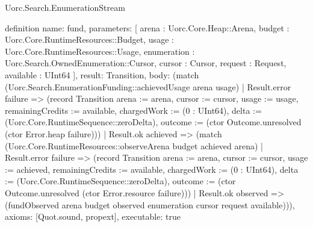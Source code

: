 \begin{lexlean}{Uorc.Search.EnumerationStream}
\begin{semanticmodule}
definition{
  name: fund,
  parameters: [
    arena : Uorc.Core.Heap::Arena,
    budget : Uorc.Core.RuntimeResources::Budget,
    usage : Uorc.Core.RuntimeResources::Usage,
    enumeration : Uorc.Search.OwnedEnumeration::Cursor,
    cursor : Cursor,
    request : Request,
    available : UInt64
  ],
  result: Transition,
  body: (match (Uorc.Search.EnumerationFunding::achievedUsage arena usage)
    | Result.error failure => (record Transition {arena := arena, cursor := cursor, usage := usage, remainingCredits := available, chargedWork := (0 : UInt64), delta := (Uorc.Core.RuntimeSequence::zeroDelta), outcome := (ctor Outcome.unresolved (ctor Error.heap failure))})
    | Result.ok achieved => (match (Uorc.Core.RuntimeResources::observeArena budget achieved arena)
      | Result.error failure => (record Transition {arena := arena, cursor := cursor, usage := achieved, remainingCredits := available, chargedWork := (0 : UInt64), delta := (Uorc.Core.RuntimeSequence::zeroDelta), outcome := (ctor Outcome.unresolved (ctor Error.resource failure))})
      | Result.ok observed => (fundObserved arena budget observed enumeration cursor request available))),
  axioms: [Quot.sound, propext],
  executable: true
}


\end{semanticmodule}
\end{lexlean}
